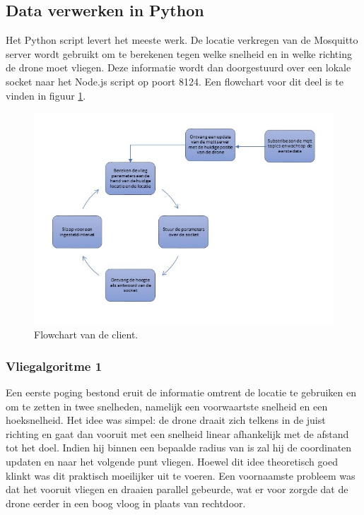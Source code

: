 \subsection{Data verwerken in Python}
Het Python script levert het meeste werk. De locatie verkregen van de Mosquitto server wordt gebruikt om te berekenen tegen welke snelheid en in welke richting de drone moet vliegen.
Deze informatie wordt dan doorgestuurd over een lokale socket naar het Node.js script op poort 8124.
Een flowchart voor dit deel is te vinden in figuur \ref{fig:flowchart_client}.
\begin{figure}[p]
	\centering
	\includegraphics[width=\textwidth]{images/python_client_flowchart}
	\caption[Flowchart van de client]{Flowchart van de client.}
	\label{fig:flowchart_client}
\end{figure}

\subsubsection{Vliegalgoritme 1}
Een eerste poging bestond eruit de informatie omtrent de locatie te gebruiken en om te zetten in twee snelheden, namelijk een voorwaartste snelheid en een hoeksnelheid.
Het idee was simpel: de drone draait zich telkens in de juist richting en gaat dan vooruit met een snelheid linear afhankelijk met de afstand tot het doel. Indien hij binnen een bepaalde radius van is zal hij de coordinaten updaten en naar het volgende punt vliegen.
Hoewel dit idee theoretisch goed klinkt was dit praktisch moeilijker uit te voeren.
Een voornaamste probleem was dat het vooruit vliegen en draaien parallel gebeurde, wat er voor zorgde dat de drone eerder in een boog vloog in plaats van rechtdoor.

